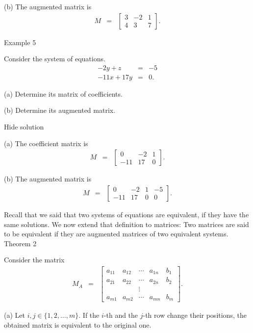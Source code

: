     (b) The augmented matrix is \begin{eqnarray*} M&=&\left[\begin{array}{ccc}3&-2&1\\ 4&3&7\end{array}\right].\end{eqnarray*}

Example 5

Consider the system of equations. \begin{eqnarray*} -2y+z&=&-5\\ -11x+17y&=&0. \end{eqnarray*}

    (a) Determine its matrix of coefficients.

    (b) Determine its augmented matrix.

Hide solution

    (a) The coefficient matrix is \begin{eqnarray*} M&=&\left[\begin{array}{ccc}0&-2&1\\ -11&17&0\end{array}\right].\end{eqnarray*}

    (b) The augmented matrix is \begin{eqnarray*} M&=&\left[\begin{array}{cccc}0&-2&1&-5\\ -11&17&0&0\end{array}\right].\end{eqnarray*}

Recall that we said that two systems of equations are equivalent, if they have the same solutions. We now extend that definition to matrices: Two matrices are said to be equivalent if they are augmented matrices of two equivalent systems.
Theorem 2


Consider the matrix \begin{eqnarray*} M_A&=&\left[\begin{array}{ccccc}a_{11}&a_{12}&\cdots&a_{1n}&b_1\\ a_{21}&a_{22}&\cdots&a_{2n}&b_2\\ &&\vdots&&\\ a_{m1}&a_{m2}&\cdots&a_{mn}&b_m\end{array}\right]. \end{eqnarray*}

    (a) Let \( i,j\in\{1,2,\dots, m\} \). If the \( i \)-th and the \( j \)-th row change their positions, the obtained matrix is equivalent to the original one.

